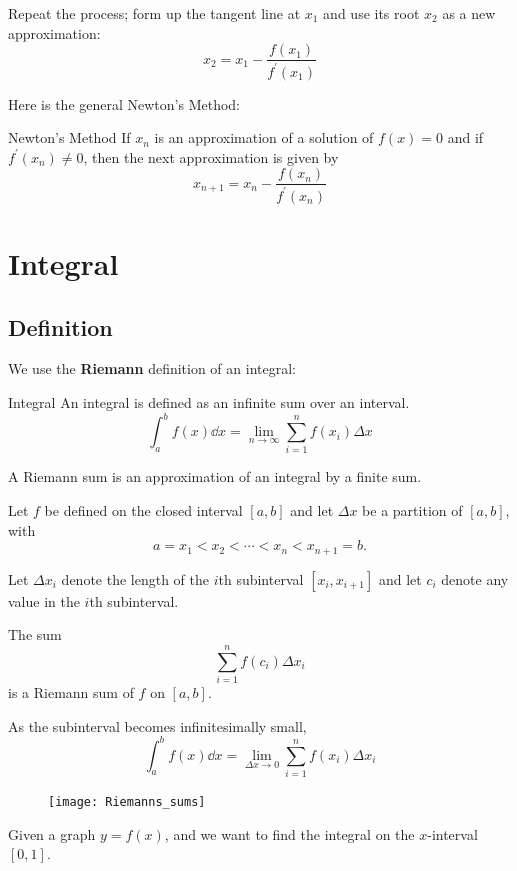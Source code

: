 Repeat the process; form up the tangent line at $x_1$ and use its root $x_2$ as a new approximation:
\[ x_2 = x_1 - \frac{f(x_1)}{f^\prime(x_1)} \]

Here is the general Newton's Method:
\begin{thrm}{Newton's Method}{}
If $x_n$ is an approximation of a solution of $f(x)=0$ and if $f^\prime(x_n) \neq 0$, then the next approximation is given by
\[ x_{n+1} = x_n - \frac{f(x_n)}{f^\prime(x_n)} \]
\end{thrm}
\pagebreak

\section{Integral}
\subsection{Definition}
We use the \textbf{Riemann} definition of an integral:
\begin{defn}{Integral}{}
An integral is defined as an infinite sum over an interval.
\begin{equation}
\int_a^b f(x) \dd{x} = \lim_{n \to \infty} \sum_{i=1}^n f(x_i) \Delta x
\end{equation}
\end{defn}

A Riemann sum is an approximation of an integral by a finite sum.

Let $f$ be defined on the closed interval $[a,b]$ and let $\Delta x$ be a partition of $[a,b]$, with
\[ a=x_1 < x_2 < \cdots < x_n < x_{n+1}=b.\]

Let $\Delta x_i$ denote the length of the $i$th subinterval $[x_i,x_{i+1}]$ and let $c_i$ denote any value in the $i$th subinterval.

The sum
\[ \sum_{i=1}^n f(c_i)\Delta x_i\]
is a Riemann sum of $f$ on $[a,b]$.

As the subinterval becomes infinitesimally small, 
\begin{equation} \int _{a}^{b}f(x) \dd{x} = \lim _{\Delta x \to 0} \sum _{i=1}^{n} f(x_{i}) \Delta x_{i} \end{equation}

\begin{figure}[H]
	\centering
	\texttt{[image: Riemanns\_sums]}
\end{figure}

Given a graph $y=f(x)$, and we want to find the integral on the $x$-interval $[0,1]$.

